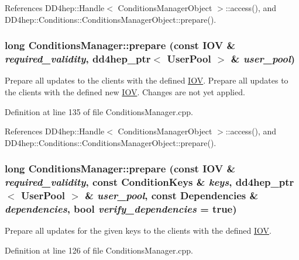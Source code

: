References DD4hep::Handle$<$ ConditionsManagerObject $>$::access(), and DD4hep::Conditions::ConditionsManagerObject::prepare().\hypertarget{class_d_d4hep_1_1_conditions_1_1_conditions_manager_a16a1aa58d0a9d61d9bed50b16705a63e}{
\subsubsection[{prepare}]{\setlength{\rightskip}{0pt plus 5cm}long ConditionsManager::prepare (const {\bf IOV} \& {\em required\_\-validity}, \/  {\bf dd4hep\_\-ptr}$<$ {\bf UserPool} $>$ \& {\em user\_\-pool})}}
\label{class_d_d4hep_1_1_conditions_1_1_conditions_manager_a16a1aa58d0a9d61d9bed50b16705a63e}


Prepare all updates to the clients with the defined \hyperlink{class_d_d4hep_1_1_i_o_v}{IOV}. Prepare all updates to the clients with the defined new \hyperlink{class_d_d4hep_1_1_i_o_v}{IOV}. Changes are not yet applied. 

Definition at line 135 of file ConditionsManager.cpp.

References DD4hep::Handle$<$ ConditionsManagerObject $>$::access(), and DD4hep::Conditions::ConditionsManagerObject::prepare().\hypertarget{class_d_d4hep_1_1_conditions_1_1_conditions_manager_a8b8e72ff8060db98ecbd19a6a05eafa6}{
\subsubsection[{prepare}]{\setlength{\rightskip}{0pt plus 5cm}long ConditionsManager::prepare (const {\bf IOV} \& {\em required\_\-validity}, \/  const {\bf ConditionKeys} \& {\em keys}, \/  {\bf dd4hep\_\-ptr}$<$ {\bf UserPool} $>$ \& {\em user\_\-pool}, \/  const {\bf Dependencies} \& {\em dependencies}, \/  bool {\em verify\_\-dependencies} = {\ttfamily true})}}
\label{class_d_d4hep_1_1_conditions_1_1_conditions_manager_a8b8e72ff8060db98ecbd19a6a05eafa6}


Prepare all updates for the given keys to the clients with the defined \hyperlink{class_d_d4hep_1_1_i_o_v}{IOV}. 

Definition at line 126 of file ConditionsManager.cpp.

